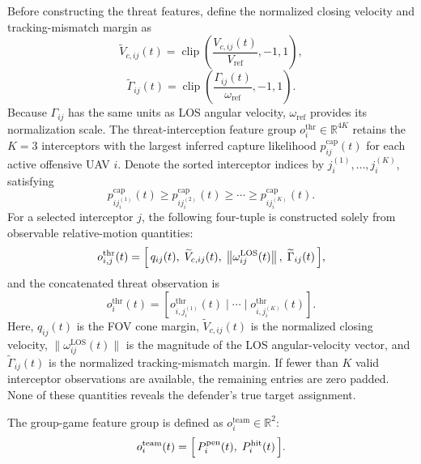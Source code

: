 \documentclass{cja}
\begin{document}
Before constructing the threat features, define the normalized closing velocity and tracking-mismatch margin as
\begin{equation}
\widetilde V_{c,ij}(t)
=
\operatorname{clip}\!\left(
\frac{V_{c,ij}(t)}{V_{\mathrm{ref}}},
-1,1
\right),
\end{equation}
\begin{equation}
\widetilde\Gamma_{ij}(t)
=
\operatorname{clip}\!\left(
\frac{\Gamma_{ij}(t)}{\omega_{\mathrm{ref}}},
-1,1
\right).
\end{equation}
Because $\Gamma_{ij}$ has the same units as LOS angular velocity, $\omega_{\mathrm{ref}}$ provides its normalization scale. The threat-interception feature group $o_i^{\mathrm{thr}}\in\mathbb{R}^{4K}$ retains the $K=3$ interceptors with the largest inferred capture likelihood $p_{ij}^{\mathrm{cap}}(t)$ for each active offensive UAV $i$. Denote the sorted interceptor indices by $j_i^{(1)},\ldots,j_i^{(K)}$, satisfying
\begin{equation}
p_{i j_i^{(1)}}^{\mathrm{cap}}(t)
\ge p_{i j_i^{(2)}}^{\mathrm{cap}}(t)
\ge\cdots\ge
p_{i j_i^{(K)}}^{\mathrm{cap}}(t).
\end{equation}
For a selected interceptor $j$, the following four-tuple is constructed solely from observable relative-motion quantities:
\begin{equation}
o_{i,j}^{\mathrm{thr}}(t)=
\Bigl[\,
q_{ij}(t),\;
\widetilde V_{c,ij}(t),\;
\left\|\omega_{ij}^{\mathrm{LOS}}(t)\right\|,\;
\widetilde\Gamma_{ij}(t)
\,\Bigr],
\label{eq:obs-thr}
\end{equation}
and the concatenated threat observation is
\begin{equation}
o_i^{\mathrm{thr}}(t)
=
\left[
o_{i,j_i^{(1)}}^{\mathrm{thr}}(t)
\mid\cdots\mid
o_{i,j_i^{(K)}}^{\mathrm{thr}}(t)
\right].
\end{equation}
Here, $q_{ij}(t)$ is the FOV cone margin, $\widetilde V_{c,ij}(t)$ is the normalized closing velocity, $\|\omega_{ij}^{\mathrm{LOS}}(t)\|$ is the magnitude of the LOS angular-velocity vector, and $\widetilde\Gamma_{ij}(t)$ is the normalized tracking-mismatch margin. If fewer than $K$ valid interceptor observations are available, the remaining entries are zero padded. None of these quantities reveals the defender's true target assignment.

The group-game feature group is defined as $o_i^{\mathrm{team}}\in\mathbb{R}^{2}$:
\begin{equation}
o_i^{\mathrm{team}}(t)=\Bigl[\,P_i^{\mathrm{pen}}(t),\;P_i^{\mathrm{hit}}(t)\,\Bigr].
\label{eq:obs-team}
\end{equation}
\end{document}
